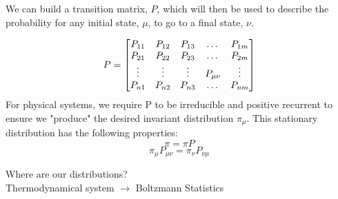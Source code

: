 \begin{frame}
We can build a transition matrix, $P$, which will then be used to describe the probability for any initial state, $\mu$, to go to a final state, $\nu$. 

\[
P = 
\begin{bmatrix}
	P_{11} & P_{12} & P_{13} &    \dots    & P_{1m} \\
	P_{21} & P_{22} & P_{23} &    \dots    & P_{2m} \\
	\vdots & \vdots & \vdots & P_{\mu \nu} & \vdots \\
	P_{n1} & P_{n2} & P_{n3} &    \dots    & P_{nm}
\end{bmatrix}\vspace{.25cm}\]
For physical systems, we require P to be irreducible and positive recurrent to ensure we "produce" the desired invariant distribution $\pi_\mu$. This stationary distribution has the following properties:
\begin{equation}
\pi = \pi P
\end{equation}
\begin{equation}
\pi_\mu P_{\mu\nu}= \pi_\nu P_{\nu\mu}
\end{equation}
\begin{center}
	Where are our distributions?\\
	Thermodynamical system $ \rightarrow $ Boltzmann Statistics
\end{center}


\end{frame}
